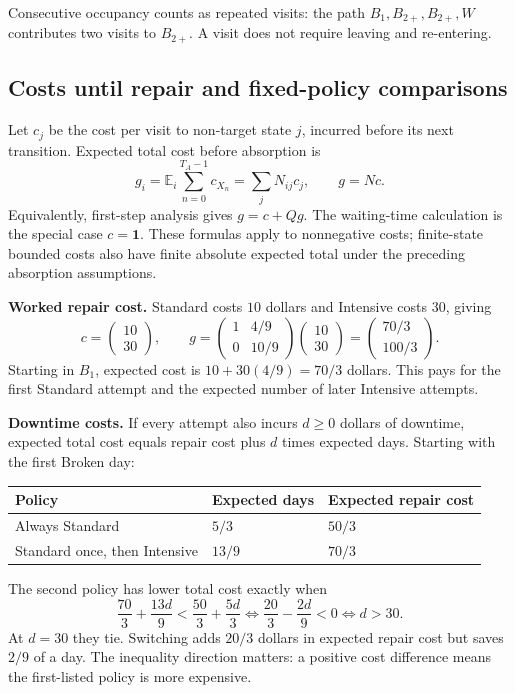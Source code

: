 \documentclass[11pt]{article}
\theoremstyle{remark}\newtheorem{remark}[definition]{Remark}
\newcommand{\E}{\mathbb E}\newcommand{\Prob}{\mathbb P}
\begin{document}
Consecutive occupancy counts as repeated visits: the path $B_1,B_{2+},B_{2+},W$ contributes two visits to $B_{2+}$. A visit does not require leaving and re-entering.

\clearpage
\subsection{Costs until repair and fixed-policy comparisons}
Let $c_j$ be the cost per visit to non-target state $j$, incurred before its next transition. Expected total cost before absorption is
\[
g_i=\E_i\sum_{n=0}^{T_A-1}c_{X_n}
=\sum_jN_{ij}c_j,\qquad \boxed{g=Nc.}
\]
Equivalently, first-step analysis gives $g=c+Qg$. The waiting-time calculation is the special case $c=\mathbf1$. These formulas apply to nonnegative costs; finite-state bounded costs also have finite absolute expected total under the preceding absorption assumptions.

\textbf{Worked repair cost.} Standard costs $10$ dollars and Intensive costs $30$, giving
\[
c=\begin{pmatrix}10\\30\end{pmatrix},\qquad
g=\begin{pmatrix}1&4/9\\0&10/9\end{pmatrix}
\begin{pmatrix}10\\30\end{pmatrix}
=\begin{pmatrix}70/3\\100/3\end{pmatrix}.
\]
Starting in $B_1$, expected cost is $10+30(4/9)=70/3$ dollars. This pays for the first Standard attempt and the expected number of later Intensive attempts.

\textbf{Downtime costs.} If every attempt also incurs $d\geq0$ dollars of downtime, expected total cost equals repair cost plus $d$ times expected days. Starting with the first Broken day:
\begin{center}
\begin{tabular}{@{}lll@{}}\toprule
Policy & Expected days & Expected repair cost\\\midrule
Always Standard & $5/3$ & $50/3$\\
Standard once, then Intensive & $13/9$ & $70/3$\\\bottomrule
\end{tabular}
\end{center}
The second policy has lower total cost exactly when
\[
\frac{70}{3}+\frac{13d}{9}<\frac{50}{3}+\frac{5d}{3}
\iff \frac{20}{3}-\frac{2d}{9}<0
\iff \boxed{d>30}.
\]
At $d=30$ they tie. Switching adds $20/3$ dollars in expected repair cost but saves $2/9$ of a day. The inequality direction matters: a positive cost difference means the first-listed policy is more expensive.
\end{document}
